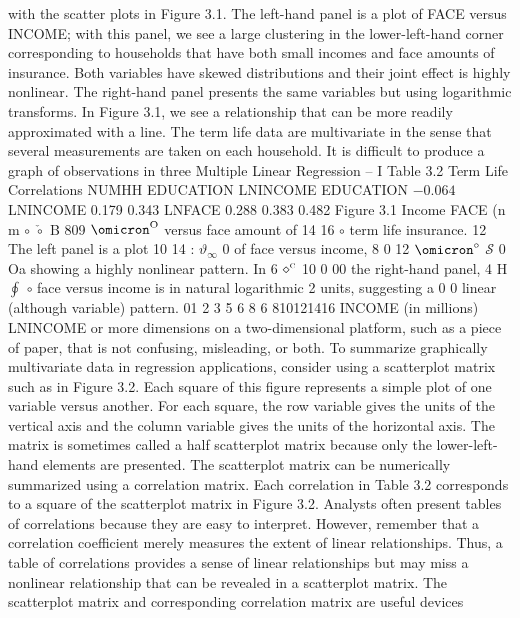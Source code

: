 \documentclass[11pt]{article}
\begin{document}
with the scatter plots in Figure 3.1. The left-hand panel is a plot of FACE versus
INCOME; with this panel, we see a large clustering in the lower-left-hand corner
corresponding to households that have both small incomes and face amounts
of insurance. Both variables have skewed distributions and their joint effect is
 highly nonlinear. The right-hand panel presents the same variables but using
logarithmic transforms. In Figure 3.1, we see a relationship that can be more
readily approximated with a line.
 The term life data are multivariate in the sense that several measurements are
 taken on each household. It is difficult to produce a graph of observations in three
 Multiple Linear Regression -- I
Table 3.2 Term Life
Correlations NUMHH EDUCATION LNINCOME
EDUCATION \(- 0 . 0 6 4\)
LNINCOME 0.179 0.343
LNFACE 0.288 0.383 0.482
Figure 3.1 Income FACE (n m \(\circ\) \(\check{\circ}\) B 809 \(\omicron^{\mathrm{O}}\)
versus face amount of 14 16 \(\circ\)
 term life insurance. 12
The left panel is a plot 10 14 : \(\vartheta_{\infty}\) 0
 of face versus income, 8 0 12 \(\omicron^{\circ}\) \(\mathcal{S}\) 0 Oa
 showing a highly
 nonlinear pattern. In 6 \(\diamond^{\textsc{c}}\) 10 0 00
 the right-hand panel, 4 H \(\oint\) \(\circ\)
face versus income is
 in natural logarithmic 2
units, suggesting a 0 0
linear (although
variable) pattern. 01 2 3 5 6 8 6 810121416
INCOME (in millions) LNINCOME
 or more dimensions on a two-dimensional platform, such as a piece of paper,
 that is not confusing, misleading, or both. To summarize graphically multivariate
data in regression applications, consider using a scatterplot matrix such as in
Figure 3.2. Each square of this figure represents a simple plot of one variable
versus another. For each square, the row variable gives the units of the vertical
 axis and the column variable gives the units of the horizontal axis. The matrix
is sometimes called a half scatterplot matrix because only the lower-left-hand
elements are presented.
The scatterplot matrix can be numerically summarized using a correlation
matrix. Each correlation in Table 3.2 corresponds to a square of the scatterplot
 matrix in Figure 3.2. Analysts often present tables of correlations because they
are easy to interpret. However, remember that a correlation coefficient merely
measures the extent of linear relationships. Thus, a table of correlations provides
 a sense of linear relationships but may miss a nonlinear relationship that can be
revealed in a scatterplot matrix.
 The scatterplot matrix and corresponding correlation matrix are useful devices
\end{document}
